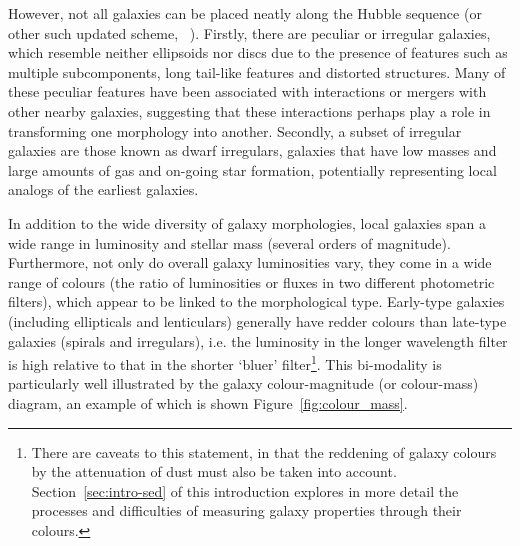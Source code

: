 However, not all galaxies can be placed neatly along the Hubble sequence (or other such updated scheme, \citeauthor{deVaucouleurs:1959vq}~\citeyear{deVaucouleurs:1959vq}). Firstly, there are peculiar or irregular galaxies, which resemble neither ellipsoids nor discs due to the presence of features such as multiple subcomponents, long tail-like features and distorted structures. Many of these peculiar features have been associated with interactions or mergers with other nearby galaxies, suggesting that these interactions perhaps play a role in transforming one morphology into another. Secondly, a subset of irregular galaxies are those known as dwarf irregulars, galaxies that have low masses and large amounts of gas and on-going star formation, potentially representing local analogs of the earliest galaxies. 

In addition to the wide diversity of galaxy morphologies, local galaxies span a wide range in luminosity and stellar mass (several orders of magnitude). Furthermore, not only do overall galaxy luminosities vary, they come in a wide range of colours (the ratio of luminosities or fluxes in two different photometric filters), which appear to be linked to the morphological type. Early-type galaxies (including ellipticals and lenticulars) generally have redder colours than late-type galaxies (spirals and irregulars), i.e. the luminosity in the longer wavelength filter is high relative to that in the shorter `bluer' filter\footnote{There are caveats to this statement, in that the reddening of galaxy colours by the attenuation of dust must also be taken into account. Section~\ref{sec:intro-sed} of this introduction explores in more detail the processes and difficulties of measuring galaxy properties through their colours.}. This bi-modality is particularly well illustrated by the galaxy colour-magnitude (or colour-mass) diagram, an example of which is shown Figure~\ref{fig:colour_mass}.

